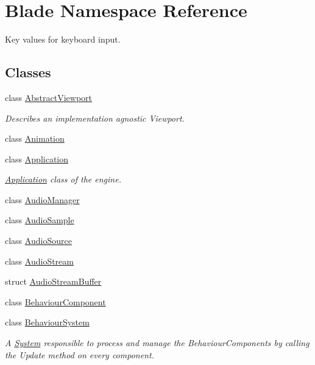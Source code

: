 \hypertarget{namespace_blade}{}\section{Blade Namespace Reference}
\label{namespace_blade}


Key values for keyboard input.  


\subsection*{Classes}
\begin{DoxyCompactItemize}
\item 
class \hyperlink{class_blade_1_1_abstract_viewport}{Abstract\+Viewport}
\begin{DoxyCompactList}\small\item\em Describes an implementation agnostic Viewport. \end{DoxyCompactList}\item 
class \hyperlink{class_blade_1_1_animation}{Animation}
\item 
class \hyperlink{class_blade_1_1_application}{Application}
\begin{DoxyCompactList}\small\item\em \hyperlink{class_blade_1_1_application}{Application} class of the engine. \end{DoxyCompactList}\item 
class \hyperlink{class_blade_1_1_audio_manager}{Audio\+Manager}
\item 
class \hyperlink{class_blade_1_1_audio_sample}{Audio\+Sample}
\item 
class \hyperlink{class_blade_1_1_audio_source}{Audio\+Source}
\item 
class \hyperlink{class_blade_1_1_audio_stream}{Audio\+Stream}
\item 
struct \hyperlink{struct_blade_1_1_audio_stream_buffer}{Audio\+Stream\+Buffer}
\item 
class \hyperlink{class_blade_1_1_behaviour_component}{Behaviour\+Component}
\item 
class \hyperlink{class_blade_1_1_behaviour_system}{Behaviour\+System}
\begin{DoxyCompactList}\small\item\em A \hyperlink{class_blade_1_1_system}{System} responsible to process and manage the Behaviour\+Components by calling the Update method on every component. \end{DoxyCompactList}\item 

\end{DoxyCompactItemize}
